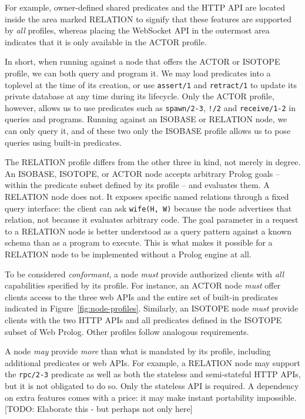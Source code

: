 For example, owner-defined shared predicates and the HTTP API are located inside the area marked RELATION to signify that these features are supported by \emph{all} profiles, whereas placing the WebSocket API in the outermost area indicates that it is only available in the ACTOR profile.

In short, when running against a node that offers the ACTOR or ISOTOPE profile, we can both query and program it. We may load predicates into a toplevel at the time of its creation, or use \texttt{assert/1} and \texttt{retract/1} to update its private database at any time during its lifecycle. Only the ACTOR profile, however, allows us to use predicates such as \texttt{spawn/2-3}, \texttt{!/2} and \texttt{receive/1-2} in queries and programs. Running against an ISOBASE or RELATION node, we can only query it, and of these two only the ISOBASE profile allows us to pose queries using built-in predicates. 

The RELATION profile differs from the other three in kind, not merely in degree. An ISOBASE, ISOTOPE, or ACTOR node accepts arbitrary Prolog goals -- within the predicate subset defined by its profile -- and evaluates them. A RELATION node does not. It exposes specific named relations through a fixed query interface: the client can ask \texttt{wife(H,\,W)} because the node advertises that relation, not because it evaluates arbitrary code. The goal parameter in a request to a RELATION node is better understood as a query pattern against a known schema than as a program to execute. This is what makes it possible for a RELATION node to be implemented without a Prolog engine at all.

To be considered \textit{conformant}, a node \textit{must} provide authorized clients with \textit{all} capabilities specified by its profile. For instance, an ACTOR node \textit{must} offer clients access to the three web APIs and the entire set of built-in predicates indicated in Figure~\ref{fig:node-profiles}. Similarly, an ISOTOPE node \textit{must} provide clients with the two HTTP APIs and all predicates defined in the ISOTOPE subset of Web Prolog. Other profiles follow analogous requirements.

A node \textit{may} provide \textit{more} than what is mandated by its profile, including additional predicates or web APIs.  For example, a RELATION node may support the \texttt{rpc/2-3} predicate as well as both the stateless and semi-stateful HTTP APIs, but it is not obligated to do so. Only the stateless API is required. A dependency on extra features comes with a price: it may make instant portability impossible. [TODO: Elaborate this - but perhaps not only here]

